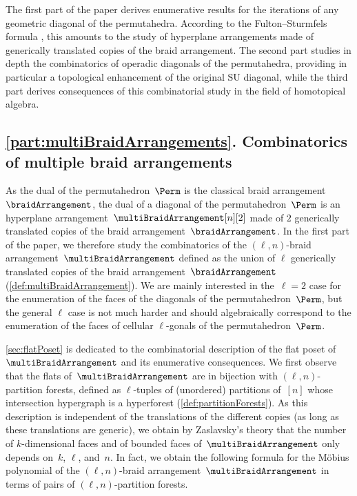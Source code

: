 \documentclass{amsart}
\theoremstyle{definition}
\newcommand{\SU}{\mathrm{SU}}
\begin{document}
The first part of the paper derives enumerative results for the iterations of any geometric diagonal of the permutahedra. 
According to the Fulton--Sturmfels formula \cite{FultonSturmfels}, this amounts to the study of hyperplane arrangements made of generically translated copies of the braid arrangement.
The second part studies in depth the combinatorics of operadic diagonals of the permutahedra, providing in particular a topological enhancement of the original $\SU$ diagonal, while the third part derives consequences of this combinatorial study in the field of homotopical algebra.


\subsection*{\cref{part:multiBraidArrangements}. Combinatorics of multiple braid arrangements}

As the dual of the permutahedron~$\Perm$ is the classical braid arrangement~$\braidArrangement$, the dual of a diagonal of the permutahedron~$\Perm$ is an hyperplane arrangement~$\multiBraidArrangement[n][2]$ made of $2$ generically translated copies of the braid arrangement~$\braidArrangement$.
In the first part of the paper, we therefore study the combinatorics of the $(\ell,n)$-braid arrangement~$\multiBraidArrangement$ defined as the union of $\ell$ generically translated copies of the braid arrangement~$\braidArrangement$ (\cref{def:multiBraidArrangement}).
We are mainly interested in the~$\ell = 2$ case for the enumeration of the faces of the diagonals of the permutahedron~$\Perm$, but the general $\ell$ case is not much harder and should algebraically correspond to the enumeration of the faces of cellular $\ell$-gonals of the permutahedron~$\Perm$.

\cref{sec:flatPoset} is dedicated to the combinatorial description of the flat poset of~$\multiBraidArrangement$ and its enumerative consequences.
We first observe that the flats of~$\multiBraidArrangement$ are in bijection with $(\ell,n)$-partition forests, defined as $\ell$-tuples of (unordered) partitions of~$[n]$ whose intersection hypergraph is a hyperforest (\cref{def:partitionForests}).
As this description is independent of the translations of the different copies (as long as these translations are generic), we obtain by Zaslavsky's theory that the number of \mbox{$k$-dimensional} faces and of bounded faces of~$\multiBraidArrangement$ only depends on~$k$, $\ell$, and~$n$. %
In fact, we obtain the following formula for the M\"obius polynomial of the $(\ell,n)$-braid arrangement~$\multiBraidArrangement$ in terms of pairs of $(\ell,n)$-partition forests.
\end{document}
